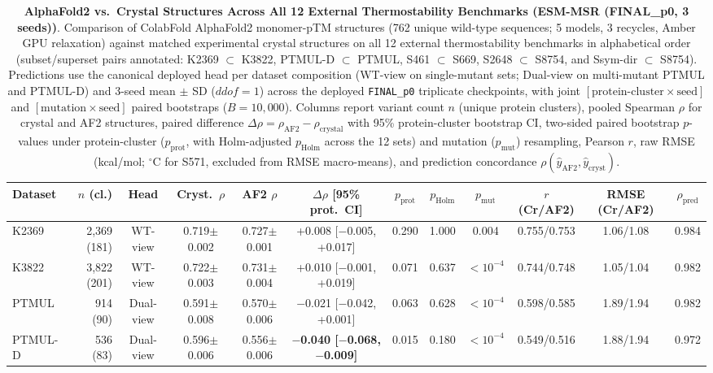 \begin{table}[htbp]
\centering
\scriptsize
\setlength{\tabcolsep}{3.2pt}
\caption{\textbf{AlphaFold2 vs.\ Crystal Structures Across All 12 External Thermostability Benchmarks (ESM-MSR (FINAL\_p0, 3 seeds))}. Comparison of ColabFold AlphaFold2 monomer-pTM structures (762 unique wild-type sequences; 5 models, 3 recycles, Amber GPU relaxation) against matched experimental crystal structures on all 12 external thermostability benchmarks in alphabetical order (subset/superset pairs annotated: K2369 $\subset$ K3822, PTMUL-D $\subset$ PTMUL, S461 $\subset$ S669, S2648 $\subset$ S8754, and Ssym-dir $\subset$ S8754). Predictions use the canonical deployed head per dataset composition (WT-view on single-mutant sets; Dual-view on multi-mutant PTMUL and PTMUL-D) and 3-seed mean $\pm$ SD ($ddof=1$) across the deployed \texttt{FINAL\_p0} triplicate checkpoints, with joint $[\text{protein-cluster} \times \text{seed}]$ and $[\text{mutation} \times \text{seed}]$ paired bootstraps ($B=10,000$). Columns report variant count $n$ (unique protein clusters), pooled Spearman $\rho$ for crystal and AF2 structures, paired difference $\Delta\rho = \rho_{\mathrm{AF2}} - \rho_{\mathrm{crystal}}$ with 95\% protein-cluster bootstrap CI, two-sided paired bootstrap $p$-values under protein-cluster ($p_{\mathrm{prot}}$, with Holm-adjusted $p_{\mathrm{Holm}}$ across the 12 sets) and mutation ($p_{\mathrm{mut}}$) resampling, Pearson $r$, raw RMSE (kcal/mol; $^\circ$C for S571, excluded from RMSE macro-means), and prediction concordance $\rho(\hat{y}_{\mathrm{AF2}}, \hat{y}_{\mathrm{cryst}})$.}\label{tab:si_af2_vs_crystal}
\begin{tabular}{lrcccccccccc}
\toprule
Dataset & $n$ (cl.) & Head & Cryst.\ $\rho$ & AF2 $\rho$ & $\Delta\rho$ [95\% prot.\ CI] & $p_{\mathrm{prot}}$ & $p_{\mathrm{Holm}}$ & $p_{\mathrm{mut}}$ & $r$ (Cr/AF2) & RMSE (Cr/AF2) & $\rho_{\mathrm{pred}}$ \\
\midrule
K2369 & 2,369 (181) & WT-view & 0.719$\pm$0.002 & 0.727$\pm$0.001 & +0.008 [$-$0.005, +0.017] & 0.290 & 1.000 & 0.004 & 0.755/0.753 & 1.06/1.08 & 0.984 \\
K3822 & 3,822 (201) & WT-view & 0.722$\pm$0.003 & 0.731$\pm$0.004 & +0.010 [$-$0.001, +0.019] & 0.071 & 0.637 & $<10^{-4}$ & 0.744/0.748 & 1.05/1.04 & 0.982 \\
PTMUL & 914 (90) & Dual-view & 0.591$\pm$0.008 & 0.570$\pm$0.006 & $-$0.021 [$-$0.042, +0.001] & 0.063 & 0.628 & $<10^{-4}$ & 0.598/0.585 & 1.89/1.94 & 0.982 \\
PTMUL-D & 536 (83) & Dual-view & 0.596$\pm$0.006 & 0.556$\pm$0.006 & \textbf{$-$0.040 [$-$0.068, $-$0.009]} & 0.015 & 0.180 & $<10^{-4}$ & 0.549/0.516 & 1.88/1.94 & 0.972 \\

\end{tabular}
\end{table}
